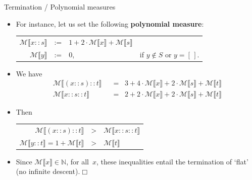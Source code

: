 \documentclass[compress,dvipdfmx]{beamer}
\newcommand\fun[1]{\textsf{#1}}
\newcommand\el{[\,]}
\newcommand\cons[2]{{#1}\!::\!{#2}}
\newcommand\measure[1]{\mathcal{M}\llbracket{#1}\rrbracket}
\begin{document}
%
\begin{frame}{Termination / Polynomial measures}

  \begin{itemize}

    \item For instance, let us set the following \textbf{polynomial
      measure}:
      \begin{center}
        \begin{tabular}{r@{\;\,}c@{\;\;}ll}
          \(\measure{\cons{x}{s}}\) & := & \(1 + 2\cdot\measure{x} +
          \measure{s}\)\\
          \(\measure{y}\) & := & \(0\), & if \(y \not\in S\) or
          \(y=\el\).
        \end{tabular}
      \end{center}

    \item We have
      \begin{align*}
        \measure{\cons{(\cons{x}{s})}{t}} & \;\; = \;\; 3 +
        4\cdot\measure{x} + 2\cdot\measure{s} + \measure{t}\\
        \measure{\cons{x}{\cons{s}{t}}} & \;\; = \;\; 2 +
        2\cdot\measure{x} + 2\cdot\measure{s} + \measure{t}
      \end{align*}

    \item Then
      \begin{center}
        \begin{tabular}{r@{\;\;}c@{\;\;}l}
          \(\measure{\cons{(\cons{x}{s})}{t}}\) & >
          & \(\measure{\cons{x}{\cons{s}{t}}}\)\\
          \(\measure{\cons{y}{t}} = 1 + \measure{t}\) & > &
          \(\measure{t}\)
        \end{tabular}
      \end{center}

    \item Since \(\measure{x} \in \mathbb{N}\), for all~\(x\), these
      inequalities entail the termination of `\fun{flat}' (no infinite
      descent).\hfill\(\Box\)

  \end{itemize}

\end{frame}
\end{document}
